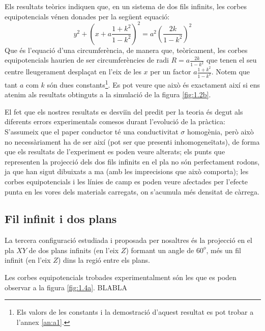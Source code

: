 \documentclass[a4paper,10.5pt]{report}
\begin{document}
Els resultats teòrics indiquen que, en un sistema de dos fils infinits, les corbes equipotencials vénen donades per la següent equació:
\begin{equation}
	y^2+\left( x+a\frac{1+k^2}{1-k^2}\right)^2 = a^2\left( \frac{2k}{1-k^2}\right)^2  \label{eqsuppon}
\end{equation}
Que és l'equació d'una circumferència, de manera que, teòricament, les corbes equipotencials haurien de ser circumferències de radi $R = a\frac{2k}{1-k^2}$ que tenen el seu centre lleugerament desplaçat en l'eix de les $x$ per un factor $a\frac{1+k^2}{1-k^2}$. Notem que tant $a$ com $k$ són dues constants\footnote{Els valors de les constants i la demostració d'aquest resultat es pot trobar a l'annex \ref{an:a1}.}. Es pot veure que això és exactament així si ens atenim als resultats obtinguts a la simulació de la figura \ref{fig:1.2b}.

El fet que els nostres resultats es desviïn del predit per la teoria és degut als diferents errors experimentals comesos durant l'evolució de la pràctica: S'assumeix que el paper conductor té una conductivitat $\sigma$ homogènia, però això no necessàriament ha de ser així (pot ser que presenti inhomogeneïtats), de forma que els resultats de l'experiment es poden veure alterats; els punts que representen la projecció dels dos fils infinits en el pla no són perfectament rodons, ja que han sigut dibuixats a ma (amb les imprecisions que això comporta); les corbes equipotencials i les línies de camp es poden veure afectades per l'efecte punta en les vores dels materials carregats, on s'acumula més densitat de càrrega. 


\subsection{Fil infinit i dos plans}

La tercera configuració estudiada i proposada per nosaltres és la projecció en el pla $XY$ de dos plans infinits (en l'eix $Z$) formant un angle de $60^o$, més un fil infinit (en l'eix $Z$) dins la regió entre els plans.

Les corbes equipotencials trobades experimentalment són les que es poden observar a la figura \ref{fig:1.4a}. BLABLA
\end{document}

